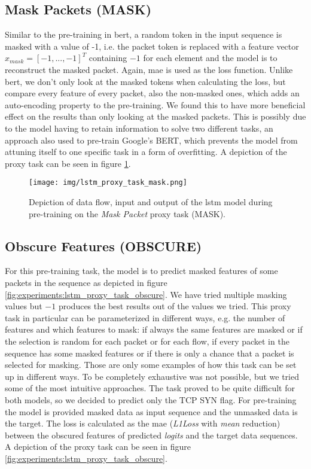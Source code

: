\subsection{Mask Packets (MASK)} \label{sec:experiments:lstm:mask_packet}

Similar to the pre-training in \gls{bert}, a random token in the input sequence is masked with a value of -1, i.e. the packet token is replaced with a feature vector $x_{mask} = [-1, ..., -1]^T$ containing $-1$ for each element and the model is to reconstruct the masked packet. Again, \gls{mae} is used as the loss function. Unlike \gls{bert}, we don't only look at the masked tokens when calculating the loss, but compare every feature of every packet, also the non-masked ones, which adds an auto-encoding property to the pre-training. We found this to have more beneficial effect on the results than only looking at the masked packets. This is possibly due to the model having to retain information to solve two different tasks, an approach also used to pre-train Google's BERT,  which prevents the model from attuning itself to one specific task in a form of overfitting. A depiction of the proxy task can be seen in figure \ref{fig:experiments:lstm_proxy_task_mask}.

\begin{figure}[h]
	\centering
	\texttt{[image: img/lstm\_proxy\_task\_mask.png]}
	\caption{Depiction of data flow, input and output of the \gls{lstm} model during pre-training on the \textit{Mask Packet} proxy task (MASK). }
	\label{fig:experiments:lstm_proxy_task_mask}
\end{figure}

\subsection{Obscure Features (OBSCURE)} \label{sec:experiments:lstm:obscure}

For this pre-training task, the model is to predict masked features of some packets in the sequence as depicted in figure \ref{fig:experiments:lstm_proxy_task_obscure}. We have tried multiple masking values but $-1$ produces the best results out of the values we tried. This proxy task in particular can be parameterized in different ways, e.g. the number of features and which features to mask: if always the same features are masked or if the selection is random for each packet or for each flow, if every packet in the sequence has some masked features or if there is only a chance that a packet is selected for masking. Those are only some examples of how this task can be set up in different ways. To be completely exhaustive was not possible, but we tried some of the most intuitive approaches. The task proved to be quite difficult for both models, so we decided to predict only the TCP SYN flag. For pre-training the model is provided masked data as input sequence and the unmasked data is the target. The loss is calculated as the \gls{mae} (\textit{L1Loss} with \textit{mean} reduction) between the obscured features of predicted \textit{logits} and the target data sequences. A depiction of the proxy task can be seen in figure \ref{fig:experiments:lstm_proxy_task_obscure}.

